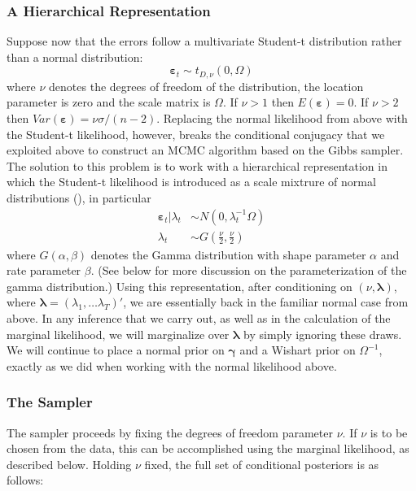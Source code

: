 \documentclass[12pt]{article}
\begin{document}
\subsubsection{A Hierarchical Representation}
Suppose now that the errors follow a multivariate Student-t distribution rather than a normal distribution: 
\begin{equation*}
\boldsymbol{\varepsilon}_{t}\sim t_{D,\nu }\left( 0,\Omega \right)
\end{equation*}
where $\nu$ denotes the degrees of freedom of the distribution, the location parameter is zero and the scale matrix is $\Omega$.
If $\nu >1$ then $E(\boldsymbol{\varepsilon}) = 0$. 
If $\nu>2$ then $Var\left( \boldsymbol{\varepsilon} \right) = \nu \sigma/(n-2)$.
Replacing the normal likelihood from above with the Student-t likelihood, however, breaks the conditional conjugacy that we exploited above to construct an MCMC algorithm based on the Gibbs sampler.
The solution to this problem is to work with a hierarchical representation in which the Student-t likelihood is introduced as a scale mixtrure of normal distributions (\cite{chib1995hierarchical}), in particular
\begin{align*}
\boldsymbol{\varepsilon}_{t}|\lambda _{t} &\sim N\left( 0,\lambda _{t}^{-1}\Omega \right)
\\
\lambda _{t} &\sim G\left( \frac{\nu }{2},\frac{\nu }{2}\right)
\end{align*}
where $G(\alpha,\beta)$ denotes the Gamma distribution with shape parameter $\alpha$ and rate parameter $\beta$.
(See below for more discussion on the parameterization of the gamma distribution.)
Using this representation, after conditioning on $\left( \nu, \boldsymbol{\lambda} \right)$, where $\boldsymbol{\lambda} = (\lambda_1, \dots \lambda_T)'$, we are essentially back in the familiar normal case from above.
In any inference that we carry out, as well as in the calculation of the marginal likelihood, we will marginalize over $\boldsymbol{\lambda}$ by simply ignoring these draws.
We will continue to place a normal prior on $\boldsymbol{\gamma}$ and a Wishart prior on $\Omega^{-1}$, exactly as we did when working with the normal likelihood above.

\subsubsection{The Sampler}
The sampler proceeds by fixing the degrees of freedom parameter $\nu$.
If $\nu$ is to be chosen from the data, this can be accomplished using the marginal likelihood, as described below.
Holding $\nu$ fixed, the full set of conditional posteriors is as follows:
\end{document}
